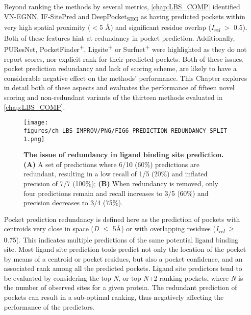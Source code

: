 Beyond ranking the methods by several metrics, \autoref{chap:LBS_COMP} identified VN-EGNN, IF-SitePred and DeepPocket\textsubscript{SEG} as having predicted pockets within very high spatial proximity ($<$5 \AA{}) and significant residue overlap (\textit{I\textsubscript{rel}} $>$ 0.5). Both of these features hint at redundancy in pocket prediction. Additionally, PUResNet, PocketFinder\textsuperscript{+}, Ligsite\textsuperscript{+} or Surfnet\textsuperscript{+} were highlighted as they do not report scores, nor explicit rank for their predicted pockets. Both of these issues, pocket prediction redundancy and lack of scoring scheme, are likely to have a considerable negative effect on the methods' performance. This Chapter explores in detail both of these aspects and evaluates the performance of fifteen novel scoring and non-redundant variants of the thirteen methods evaluated in \autoref{chap:LBS_COMP}.

\begin{figure}[htb!]
    \centering
    \texttt{[image: figures/ch\_LBS\_IMPROV/PNG/FIG6\_PREDICTION\_REDUNDANCY\_SPLIT\_1.png]}
    \caption[The issue of redundancy in ligand binding site prediction]{\textbf{The issue of redundancy in ligand binding site prediction.} \textbf{(A)} A set of predictions where 6/10 (60\%) predictions are redundant, resulting in a low recall of 1/5 (20\%) and inflated precision of 7/7 (100\%); \textbf{(B)} When redundancy is removed, only four predictions remain and recall increases to 3/5 (60\%) and precision decreases to 3/4 (75\%).}
    \label{fig:prediction_redundancy}
\end{figure}

Pocket prediction redundancy is defined here as the prediction of pockets with centroids very close in space (\textit{D} $\leq$ 5\AA{}) or with overlapping residues (\textit{I\textsubscript{rel}} $\geq$ 0.75). This indicates multiple predictions of the same potential ligand binding site. Most ligand site prediction tools predict not only the location of the pocket by means of a centroid or pocket residues, but also a pocket confidence, and an associated rank among all the predicted pockets. Ligand site predictors tend to be evaluated by considering the top-\textit{N}, or top-\textit{N}+2 ranking pockets, where \textit{N} is the number of observed sites for a given protein. The redundant prediction of pockets can result in a sub-optimal ranking, thus negatively affecting the performance of the predictors.

\newpage

